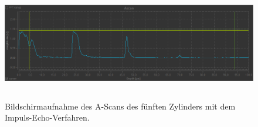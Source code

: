 \begin{figure}
    \centering
    \includegraphics[width=15cm, height=5cm]{build/Messung1.5.png}
    \caption{Bildschirmaufnahme des A-Scans des fünften Zylinders mit dem Impuls-Echo-Verfahren.}
    \label{m1.5}
\end{figure}

